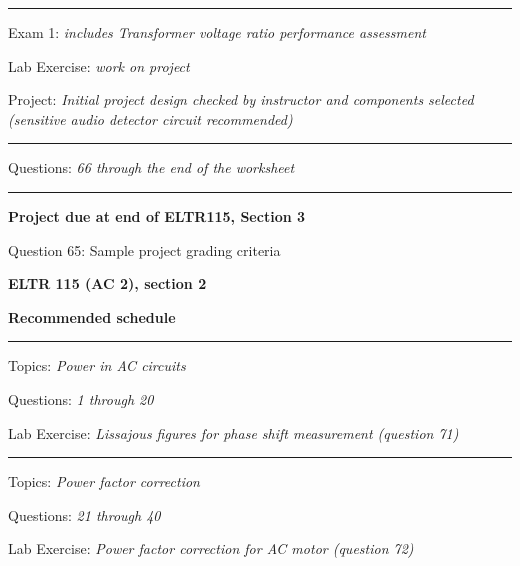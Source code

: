 \vskip 10pt
\hrule \vskip 5pt
\noindent
{}

\hskip 10pt Exam 1: {\it includes Transformer voltage ratio performance assessment}
 
\hskip 10pt Lab Exercise: {\it work on project}
 
\hskip 10pt Project: {\it Initial project design checked by instructor and components selected (sensitive audio detector circuit recommended)}
  
\vskip 10pt
\hrule \vskip 5pt
\noindent
{}

\hskip 10pt Questions: {\it 66 through the end of the worksheet}
 
\vskip 10pt
\hrule \vskip 5pt
\noindent
{}

\hskip 10pt {\bf Project due at end of ELTR115, Section 3}
 
\hskip 10pt Question 65: Sample project grading criteria
 
\vskip 10pt










\vfil \eject

\centerline{\bf ELTR 115 (AC 2), section 2} \bigskip 
 
\vskip 10pt

\noindent
{\bf Recommended schedule}

\vskip 5pt

\hrule \vskip 5pt
\noindent
{}

\hskip 10pt Topics: {\it Power in AC circuits}
 
\hskip 10pt Questions: {\it 1 through 20}
 
\hskip 10pt Lab Exercise: {\it Lissajous figures for phase shift measurement (question 71)}
 
\vskip 10pt
\hrule \vskip 5pt
\noindent
{}

\hskip 10pt Topics: {\it Power factor correction}
 
\hskip 10pt Questions: {\it 21 through 40}
 
\hskip 10pt Lab Exercise: {\it Power factor correction for AC motor (question 72)}
 

